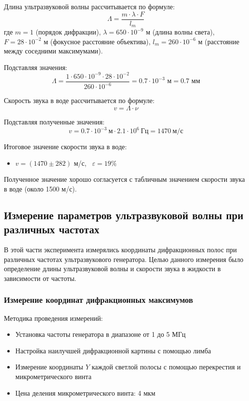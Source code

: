 Длина ультразвуковой волны рассчитывается по формуле:
\begin{equation}
    \Lambda = \frac{m \cdot \lambda \cdot F}{l_m}
\end{equation}
где $m = 1$ (порядок дифракции), $\lambda = 650 \cdot 10^{-9}$ м (длина волны света), $F = 28 \cdot 10^{-2}$ м (фокусное расстояние объектива), $l_m = 260 \cdot 10^{-6}$ м (расстояние между соседними максимумами).

Подставляя значения:
\begin{equation}
    \Lambda = \frac{1 \cdot 650 \cdot 10^{-9} \cdot 28 \cdot 10^{-2}}{260 \cdot 10^{-6}} = 0.7 \cdot 10^{-3} \text{ м} = 0.7 \text{ мм}
\end{equation}

Скорость звука в воде рассчитывается по формуле:
\begin{equation}
    v = \Lambda \cdot \nu
\end{equation}

Подставляя полученные значения:
\begin{equation}
    v = 0.7 \cdot 10^{-3}\ \text{м} \cdot 2.1 \cdot 10^6\ \text{Гц} = 1470\ \text{м/с}
\end{equation}

Итоговое значение скорости звука в воде:
\begin{itemize}
    \item $v = (1470 \pm 282)$ м/с, \ $\varepsilon = 19\%$
\end{itemize}

Полученное значение хорошо согласуется с табличным значением скорости звука в воде (около 1500 м/с).

\subsection{Измерение параметров ультразвуковой волны при различных частотах}

В этой части эксперимента измерялись координаты дифракционных полос при различных частотах ультразвукового генератора. Целью данного измерения было определение длины ультразвуковой волны и скорости звука в жидкости в зависимости от частоты.

\subsubsection{Измерение координат дифракционных максимумов}

Методика проведения измерений:
\begin{itemize}
    \item Установка частоты генератора в диапазоне от 1 до 5 МГц
    \item Настройка наилучшей дифракционной картины с помощью лимба
    \item Измерение координаты $Y$ каждой светлой полосы с помощью перекрестия и микрометрического винта
    \item Цена деления микрометрического винта: 4 мкм
\end{itemize}

